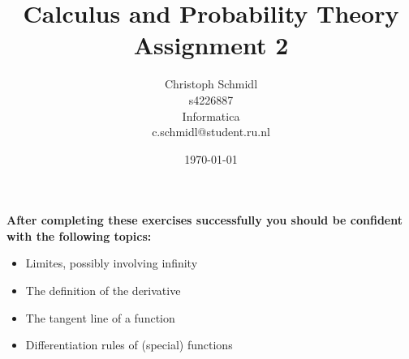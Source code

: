 \documentclass[a4paper]{article}
\title{Calculus and Probability Theory\\ Assignment 2}
\author{Christoph Schmidl\\
s4226887\\
Informatica\\
c.schmidl@student.ru.nl\\}
\date{\today}
\begin{document}
\maketitle

\textbf{After completing these exercises successfully you should be confident with the following topics:}

\begin{itemize}
	\item Limites, possibly involving infinity
	\item The definition of the derivative
	\item The tangent line of a function
	\item Differentiation rules of (special) functions
\end{itemize}
\vspace{1em}
\end{document}
